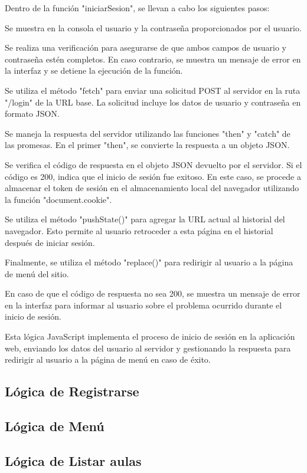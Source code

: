 \documentclass[12pt]{report}
\begin{document}
Dentro de la función "iniciarSesion", se llevan a cabo los siguientes pasos:

Se muestra en la consola el usuario y la contraseña proporcionados por el usuario.

Se realiza una verificación para asegurarse de que ambos campos de usuario y contraseña estén completos. En caso contrario, se muestra un mensaje de error en la interfaz y se detiene la ejecución de la función.

Se utiliza el método "fetch" para enviar una solicitud POST al servidor en la ruta "/login" de la URL base. La solicitud incluye los datos de usuario y contraseña en formato JSON.

Se maneja la respuesta del servidor utilizando las funciones "then" y "catch" de las promesas. En el primer "then", se convierte la respuesta a un objeto JSON.

Se verifica el código de respuesta en el objeto JSON devuelto por el servidor. Si el código es 200, indica que el inicio de sesión fue exitoso. En este caso, se procede a almacenar el token de sesión en el almacenamiento local del navegador utilizando la función "document.cookie".

Se utiliza el método "pushState()" para agregar la URL actual al historial del navegador. Esto permite al usuario retroceder a esta página en el historial después de iniciar sesión.

Finalmente, se utiliza el método "replace()" para redirigir al usuario a la página de menú del sitio.

En caso de que el código de respuesta no sea 200, se muestra un mensaje de error en la interfaz para informar al usuario sobre el problema ocurrido durante el inicio de sesión.

Esta lógica JavaScript implementa el proceso de inicio de sesión en la aplicación web, enviando los datos del usuario al servidor y gestionando la respuesta para redirigir al usuario a la página de menú en caso de éxito.

\subsection{Lógica de Registrarse}
\subsection{Lógica de Menú}
\subsection{Lógica de Listar aulas}
\end{document}

